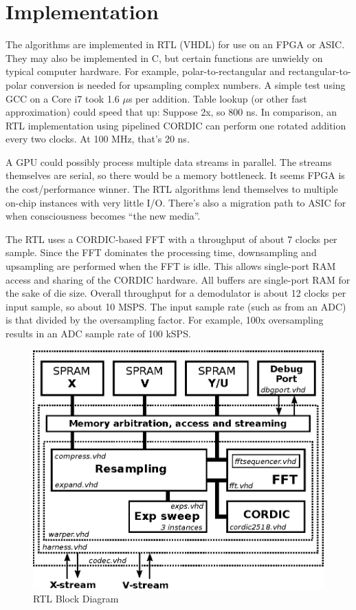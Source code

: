 \section{Implementation}

The algorithms are implemented in RTL (VHDL) for use on an FPGA or ASIC.
They may also be implemented in C, but certain functions are unwieldy on
typical computer hardware. For example, polar-to-rectangular and
rectangular-to-polar conversion is needed for upsampling complex numbers.
A simple test using GCC on a Core i7 took 1.6 $\mu$s per addition.
Table lookup (or other fast approximation) could speed that up:
Suppose 2x, so 800 ns.
In comparison, an RTL implementation using pipelined CORDIC can perform
one rotated addition every two clocks. At 100 MHz, that's 20 ns.

A GPU could possibly process multiple data streams in parallel.
The streams themselves are serial, so there would be a memory bottleneck.
It seems FPGA is the cost/performance winner.
The RTL algorithms lend themselves to multiple on-chip instances with very
little I/O. There's also a migration path to ASIC for when consciousness
becomes ``the new media''.

The RTL uses a CORDIC-based FFT with a throughput of about 7 clocks per sample.
Since the FFT dominates the processing time, downsampling and upsampling
are performed when the FFT is idle.
This allows single-port RAM access and sharing of the CORDIC hardware. 
All buffers are single-port RAM for the sake of die size.
Overall throughput for a demodulator is about 12 clocks per input sample,
so about 10 MSPS. The input sample rate (such as from an ADC) is that divided
by the oversampling factor. For example, 100x oversampling results in
an ADC sample rate of 100 kSPS.

\begin{figure}
	\centering
	\includegraphics[width=0.8\linewidth]{../source/rtl_e}
	\caption[Quantum Time to Relative Time Hardware]{RTL Block Diagram}
	\label{fig:rtl}
\end{figure}

